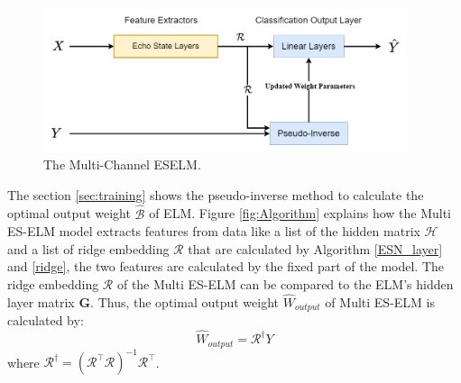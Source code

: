 \begin{figure}[ht]
    \centering
    \includegraphics[width=0.95\textwidth]{img/Echo-layer.png}
    \caption{The Multi-Channel ESELM.}
    \label{fig:multi-eselm}
\end{figure}

The section \ref{sec:training} shows the pseudo-inverse method to calculate the optimal output weight $\hat{\mathcal{B}}$ of ELM. Figure \ref{fig:Algorithm} explains how the Multi ES-ELM model extracts features from data like a list of the hidden matrix $\mathcal{H}$ and a list of ridge embedding $\mathcal{R}$ that are calculated by Algorithm \ref{ESN_layer} and \ref{ridge}, the two features are calculated by the fixed part of the model. The ridge embedding $\mathcal{R}$ of the Multi ES-ELM can be compared to the ELM's hidden layer matrix $\mathbf{G}$. Thus, the optimal output weight $\hat{W}_{output}$ of Multi ES-ELM is calculated by:
$$\hat{W}_{output} = \mathcal{R}^\dagger Y$$
where $\mathcal{R}^{\dagger} = (\mathcal{R}^\top\mathcal{R})^{-1}\mathcal{R}^\top$. 
